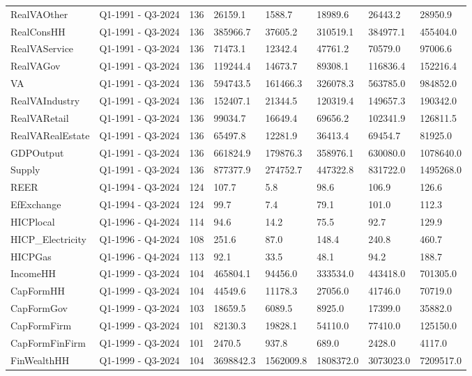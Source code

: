 \begin{longtable}[t]{llllllll}
RealVAOther & Q1-1991 - Q3-2024 & 136 & 26159.1 & 1588.7 & 18989.6 & 26443.2 & 28950.9\\
RealConsHH & Q1-1991 - Q3-2024 & 136 & 385966.7 & 37605.2 & 310519.1 & 384977.1 & 455404.0\\
RealVAService & Q1-1991 - Q3-2024 & 136 & 71473.1 & 12342.4 & 47761.2 & 70579.0 & 97006.6\\
\addlinespace
RealVAGov & Q1-1991 - Q3-2024 & 136 & 119244.4 & 14673.7 & 89308.1 & 116836.4 & 152216.4\\
VA & Q1-1991 - Q3-2024 & 136 & 594743.5 & 161466.3 & 326078.3 & 563785.0 & 984852.0\\
RealVAIndustry & Q1-1991 - Q3-2024 & 136 & 152407.1 & 21344.5 & 120319.4 & 149657.3 & 190342.0\\
RealVARetail & Q1-1991 - Q3-2024 & 136 & 99034.7 & 16649.4 & 69656.2 & 102341.9 & 126811.5\\
RealVARealEstate & Q1-1991 - Q3-2024 & 136 & 65497.8 & 12281.9 & 36413.4 & 69454.7 & 81925.0\\
\addlinespace
GDPOutput & Q1-1991 - Q3-2024 & 136 & 661824.9 & 179876.3 & 358976.1 & 630080.0 & 1078640.0\\
Supply & Q1-1991 - Q3-2024 & 136 & 877377.9 & 274752.7 & 447322.8 & 831722.0 & 1495268.0\\
REER & Q1-1994 - Q3-2024 & 124 & 107.7 & 5.8 & 98.6 & 106.9 & 126.6\\
EfExchange & Q1-1994 - Q3-2024 & 124 & 99.7 & 7.4 & 79.1 & 101.0 & 112.3\\
HICPlocal & Q1-1996 - Q4-2024 & 114 & 94.6 & 14.2 & 75.5 & 92.7 & 129.9\\
\addlinespace
HICP\_Electricity & Q1-1996 - Q4-2024 & 108 & 251.6 & 87.0 & 148.4 & 240.8 & 460.7\\
HICPGas & Q1-1996 - Q4-2024 & 113 & 92.1 & 33.5 & 48.1 & 94.2 & 188.7\\
IncomeHH & Q1-1999 - Q3-2024 & 104 & 465804.1 & 94456.0 & 333534.0 & 443418.0 & 701305.0\\
CapFormHH & Q1-1999 - Q3-2024 & 104 & 44549.6 & 11178.3 & 27056.0 & 41746.0 & 70719.0\\
CapFormGov & Q1-1999 - Q3-2024 & 103 & 18659.5 & 6089.5 & 8925.0 & 17399.0 & 35882.0\\
\addlinespace
CapFormFirm & Q1-1999 - Q3-2024 & 101 & 82130.3 & 19828.1 & 54110.0 & 77410.0 & 125150.0\\
CapFormFinFirm & Q1-1999 - Q3-2024 & 101 & 2470.5 & 937.8 & 689.0 & 2428.0 & 4117.0\\
FinWealthHH & Q1-1999 - Q3-2024 & 104 & 3698842.3 & 1562009.8 & 1808372.0 & 3073023.0 & 7209517.0\\

\end{longtable}
